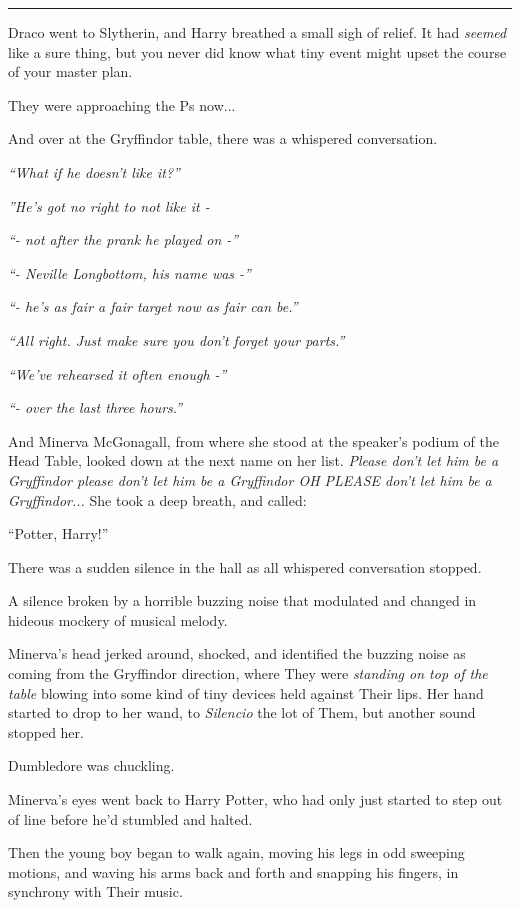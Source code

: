 \begin{center}\rule{3in}{0.4pt}\end{center}

Draco went to Slytherin, and Harry breathed a small sigh of relief. It
had \emph{seemed} like a sure thing, but you never did know what tiny
event might upset the course of your master plan.

They were approaching the Ps now...

And over at the Gryffindor table, there was a whispered conversation.

\emph{``What if he doesn't like it?''}

\emph{''He's got no right to not like it -}

\emph{``- not after the prank he played on -''}

\emph{``- Neville Longbottom, his name was -''}

\emph{``- he's as fair a fair target now as fair can be.''}

\emph{``All right. Just make sure you don't forget your parts.''}

\emph{``We've rehearsed it often enough -''}

\emph{``- over the last three hours.''}

And Minerva McGonagall, from where she stood at the speaker's podium of
the Head Table, looked down at the next name on her list. \emph{Please
don't let him be a Gryffindor please don't let him be a Gryffindor OH
PLEASE don't let him be a Gryffindor...} She took a deep breath,
and called:

``Potter, Harry!''

There was a sudden silence in the hall as all whispered conversation
stopped.

A silence broken by a horrible buzzing noise that modulated and changed
in hideous mockery of musical melody.

Minerva's head jerked around, shocked, and identified the buzzing noise
as coming from the Gryffindor direction, where They were \emph{standing
on top of the table} blowing into some kind of tiny devices held against
Their lips. Her hand started to drop to her wand, to \emph{Silencio} the
lot of Them, but another sound stopped her.

Dumbledore was chuckling.

Minerva's eyes went back to Harry Potter, who had only just started to
step out of line before he'd stumbled and halted.

Then the young boy began to walk again, moving his legs in odd sweeping
motions, and waving his arms back and forth and snapping his fingers, in
synchrony with Their music.

